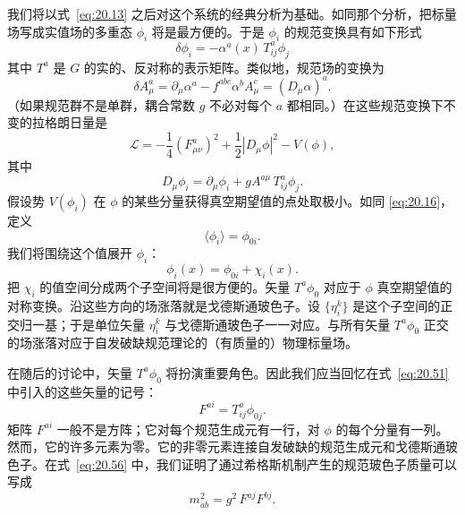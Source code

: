 我们将以式~\eqref{eq:20.13} 之后对这个系统的经典分析为基础。如同那个分析，把标量场写成实值场的多重态 $\phi_i$ 将是最方便的。于是 $\phi_i$ 的规范变换具有如下形式
\begin{equation}
  \delta\phi_i = -\alpha^a(x)\,T^a_{ij}\phi_j
  \label{eq:21.30}
\end{equation}
其中 $T^a$ 是 $G$ 的实的、反对称的表示矩阵。类似地，规范场的变换为
\begin{equation}
  \delta A^a_\mu = \partial_\mu\alpha^a - f^{abc}\alpha^b A^c_\mu
  = (D_\mu\alpha)^a .
  \label{eq:21.31}
\end{equation}
（如果规范群不是单群，耦合常数 $g$ 不必对每个 $a$ 都相同。）在这些规范变换下不变的拉格朗日量是
\begin{equation}
  \mathcal{L} = -\frac{1}{4}(F^a_{\mu\nu})^2 + \frac{1}{2}|D_\mu\phi|^2
    - V(\phi) ,
  \label{eq:21.32}
\end{equation}
其中
\begin{equation}
  D_\mu\phi_i = \partial_\mu\phi_i + gA^{a\mu}\,T^a_{ij}\phi_j .
  \label{eq:21.33}
\end{equation}
假设势 $V(\phi_i)$ 在 $\phi$ 的某些分量获得真空期望值的点处取极小。如同 \eqref{eq:20.16}，定义
\begin{equation}
  \langle\phi_i\rangle = \phi_{0i} .
  \label{eq:21.34}
\end{equation}
我们将围绕这个值展开 $\phi_i$：
\begin{equation}
  \phi_i(x) = \phi_{0i} + \chi_i(x) .
  \label{eq:21.35}
\end{equation}
把 $\chi_i$ 的值空间分成两个子空间将是很方便的。矢量 $T^a\phi_0$ 对应于 $\phi$ 真空期望值的对称变换。沿这些方向的场涨落就是戈德斯通玻色子。设 $\{\eta_i^k\}$ 是这个子空间的正交归一基；于是单位矢量 $\eta_i^k$ 与戈德斯通玻色子一一对应。与所有矢量 $T^a\phi_0$ 正交的场涨落对应于自发破缺规范理论的（有质量的）物理标量场。

在随后的讨论中，矢量 $T^a\phi_0$ 将扮演重要角色。因此我们应当回忆在式~\eqref{eq:20.51} 中引入的这些矢量的记号：
\begin{equation}
  F^{ai} = T^a_{ij}\phi_{0j} .
  \label{eq:21.36}
\end{equation}
矩阵 $F^{ai}$ 一般不是方阵；它对每个规范生成元有一行，对 $\phi$ 的每个分量有一列。然而，它的许多元素为零。它的非零元素连接自发破缺的规范生成元和戈德斯通玻色子。在式~\eqref{eq:20.56} 中，我们证明了通过希格斯机制产生的规范玻色子质量可以写成
\begin{equation}
  m^2_{ab} = g^2\,F^{aj}F^{bj} .
  \label{eq:21.37}
\end{equation}

